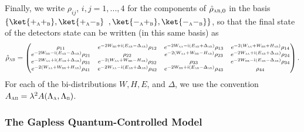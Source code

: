 \documentclass[letterpaper,12pt,titlepage,oneside,final]{book}
\newcommand{\ii}{\mathrm{i}}
\newcommand{\tc}[1]{\textsc{#1}}
\begin{document}
Finally, we write $\rho_{ij}$, $i,j = 1,...,4$ for the components of $\hat{\rho}_{\tc{ab},0}$ in the basis $\{\ket{+_\tc{a}+_\tc{b}},\ket{+_\tc{a}-_\tc{b}}$ $,\ket{-_\tc{a}+_\tc{b}},\ket{-_\tc{a}-_\tc{b}}\}$, so that the final state of the detectors state can be written (in this same basis) as
\begin{equation}\label{eq:rhoABgapless}
{\footnotesize
    \hat{\rho}_\tc{ab} = \begin{pmatrix}
        \rho_{11} & e^{-2W_{\tc{bb}} + \ii(E_\tc{ab} - \Delta_{\tc{ab}})}\rho_{12} & e^{-2W_{\tc{aa}} - \ii(E_\tc{ab} + \Delta_{\tc{ab}})}\rho_{13} & e^{-2(W_{\tc{aa}}+W_{\tc{bb}}+H_{\tc{ab}})}\rho_{14} \\
        e^{-2W_{\tc{bb}} - \ii(E_\tc{ab} - \Delta_{\tc{ab}})}\rho_{21} & \rho_{22} & e^{-2(W_{\tc{aa}}+W_{\tc{bb}}-H_{\tc{ab}})}\rho_{23} & e^{-2W_{\tc{aa}} + \ii(E_\tc{ab} + \Delta_{\tc{ab}})}\rho_{24} \\
        e^{-2W_{\tc{aa}} + \ii(E_\tc{ab} + \Delta_{\tc{ab}})}\rho_{31} & e^{-2(W_{\tc{aa}}+W_{\tc{bb}}-H_{\tc{ab}})}\rho_{32} & \rho_{33} & e^{-2W_{\tc{bb}} - \ii(E_\tc{ab} - \Delta_{\tc{ab}})}\rho_{34} \\
        e^{-2(W_{\tc{aa}}+W_{\tc{bb}}+H_{\tc{ab}})}\rho_{41} & e^{-2W_{\tc{aa}} - \ii(E_\tc{ab} + \Delta_{\tc{ab}})}\rho_{42} & e^{-2W_{\tc{bb}} + \ii(E_\tc{ab} - \Delta_{\tc{ab}})}\rho_{43} & \rho_{44} 
    \end{pmatrix}.}
\end{equation}
For each of the bi-distributions $W, H, E$, and $\Delta$, we use the convention $A_{\tc{ab}} = \lambda^2 A(\Lambda_\tc{a},\Lambda_\tc{b})$. 

\subsubsection*{The Gapless Quantum-Controlled Model}
\end{document}

